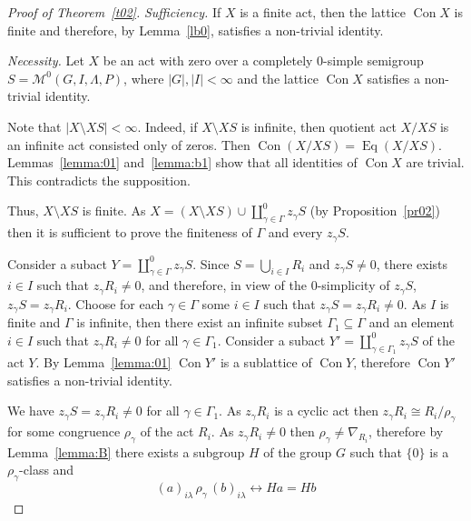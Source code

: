 \documentclass{birkau}
\numberwithin{equation}{section}
\theoremstyle{plain}
\theoremstyle{definition}
\DeclareMathOperator{\Con}{Con}
\DeclareMathOperator{\Eq}{Eq}
\begin{document}
	\begin{proof}[Proof of Theorem~\ref{t02}]
		\textit{Sufficiency.} If $X$ is a finite act, then the lattice  $\Con X$ is finite and therefore, by Lemma~\ref{lb0}, satisfies a non-trivial identity.
		
		\textit{Necessity.} Let $X$ be an act with zero over a completely 0-simple semigroup $S={\mathcal M}^0(G,I,\Lambda,P)$, where $|G|,|I| <\infty$ and the lattice $\Con X$ satisfies a non-trivial identity.

        Note that $|X\setminus XS|<\infty$. Indeed, if $X\setminus XS$ is infinite, then quotient act $X/XS$ is an infinite act consisted only of zeros. Then $\Con (X/XS) = \Eq (X/XS)$. Lemmas~\ref{lemma:01} and~\ref{lemma:b1} show that all identities of $\Con X$ are trivial. This contradicts the supposition.

        Thus, $X\setminus XS$ is finite. As $X=(X\setminus XS)\cup \coprod_{\gamma \in \Gamma}^0 z_\gamma S$ (by Proposition~\ref{pr02}) then it is sufficient to prove the finiteness of $\Gamma$ and every $z_\gamma S$.

        Consider a subact $Y=\coprod_{\gamma \in \Gamma}^0 z_\gamma S$. Since $S=\bigcup_{i \in I}R_i$ and $z_\gamma S \ne 0$, there exists $i \in I$ such that $z_\gamma R_i \ne 0$, and therefore, in view of the 0-simplicity of $z_\gamma S$, $z_\gamma S = z_\gamma R_i$. Choose for each $\gamma \in \Gamma$ some $i \in I$ such that $z_\gamma S = z_\gamma R_i \ne 0$. As $I$ is finite and $\Gamma$ is infinite, then there exist an infinite subset $\Gamma_1 \subseteq \Gamma$ and an element $i \in I$ such that $z_\gamma R_i \ne 0$ for all $\gamma \in \Gamma_1$. Consider a subact $Y' =\coprod_{\gamma \in \Gamma_1}^0 z_\gamma S$ of the act $Y$. By Lemma~\ref{lemma:01} $\Con Y'$ is a sublattice of $\Con Y$, therefore $\Con Y'$ satisfies a non-trivial identity.

        We have $z_\gamma S = z_\gamma R_i \ne 0$ for all $\gamma \in \Gamma_1$. As $z_\gamma R_i$ is a cyclic act then $z_\gamma R_i \cong R_i/\rho_\gamma$ for some congruence $\rho_\gamma$ of the act $R_i$. As $z_\gamma R_i \ne 0$ then $\rho_\gamma \ne \nabla_{R_i}$, therefore by Lemma~\ref{lemma:B} there exists a subgroup $H$ of the group $G$ such that $\{ 0 \}$ is a $\rho_\gamma$-class and
        $$ (a)_{i\lambda}\, \rho_\gamma \, (b)_{i\lambda} \leftrightarrow Ha=Hb  $$


\end{proof}
\end{document}
